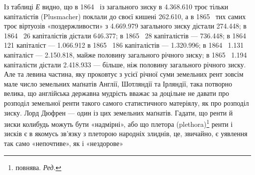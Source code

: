 Із таблиці \emph{Е} видно, що в 1864~ із загального зиску в \num{4.368.610} троє тільки капіталістів (Plusmacher) поклали до
своєї кишені \num{262.610}, а в 1865~ тих самих троє
віртуозів «поздержливости» з \num{4.669.979} загального
зиску дістали \num{274.448}; в 1864~ 26 капіталістів
дістали \num{646.377}; в 1865~ 28 капіталістів —
\num{736.448}; в 1864~ 121 капіталіст — \num{1.066.912} в 1865~ 186 капіталістів — \num{1.320.996}; в 1864~ \num{1.131} капіталіст — \num{2.150.818},
майже половину загального річного зиску; в 1865~
\num{1.194} капіталісти дістали \num{2.418.933} — більше, ніж
половину загального річного зиску. Але та левина частина,
яку проковтує з усієї річної суми земельних рент зовсім мале
число земельних маґнатів Англії, Шотляндії та Ірляндії, така
потворно велика, що англійська державна мудрість вважає за
доцільне не давати про розподіл земельної ренти такого самого
статистичного матеріялу, як про розподіл зиску. Лорд Дюфрен
— один із цих земельних маґнатів. Гадати, що ренти й зиски
колибудь можуть бути «надмірні», або що плетора (plethora)\footnote*{
повнява. \emph{Ред.}
}
ренти і зисків є в якомусь зв’язку з плеторою народніх злиднів,
це, звичайно, є уявлення так само «непочтиве», як і «нездорове»
\parbreak{}  %
